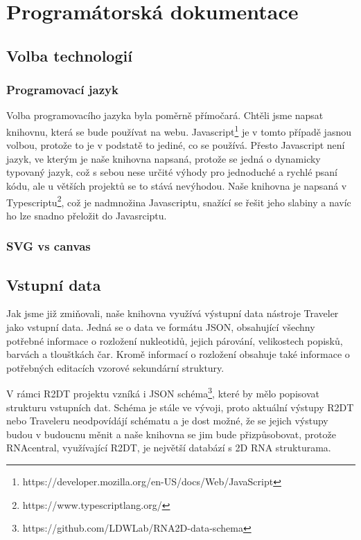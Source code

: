 
\chapter{Programátorská dokumentace}

\section{Volba technologií}

\subsection{Programovací jazyk}

Volba programovacího jazyka byla poměrně přímočará. Chtěli jsme napsat
knihovnu, která se bude používat na webu.
Javascript\footnote{https://developer.mozilla.org/en-US/docs/Web/JavaScript} je
v tomto případě jasnou volbou, protože to je v podstatě to jediné, co se
používá. Přesto Javascript není jazyk, ve kterým je naše knihovna napsaná,
protože se jedná o dynamicky typovaný jazyk, což s sebou nese určité výhody pro
jednoduché a rychlé psaní kódu, ale u větších projektů se to stává nevýhodou.
Naše knihovna je napsaná v
Typescriptu\footnote{https://www.typescriptlang.org/}, což je nadmnožina
Javascriptu, snažící se řešit jeho slabiny a navíc ho lze snadno přeložit do
Javasrciptu.

\subsection{SVG vs canvas}



\section{Vstupní data}

Jak jsme již zmiňovali, naše knihovna využívá výstupní data nástroje Traveler
jako vstupní data. Jedná se o data ve formátu JSON, obsahující všechny potřebné
informace o rozložení nukleotidů, jejich párování, velikostech popisků, barvách
a tlouštkách čar. Kromě informací o rozložení obsahuje také informace o
potřebných editacích vzorové sekundární struktury.

V rámci R2DT projektu vzníká i JSON
schéma\footnote{https://github.com/LDWLab/RNA2D-data-schema}, které by mělo
popisovat strukturu vstupních dat. Schéma je stále ve vývoji, proto aktuální
výstupy R2DT nebo Traveleru neodpovídájí schématu a je dost možné, že se jejich
výstupy budou v budoucnu měnit a naše knihovna se jim bude přizpůsobovat,
protože RNAcentral, využívající R2DT, je největší databází s
2D RNA strukturama.

